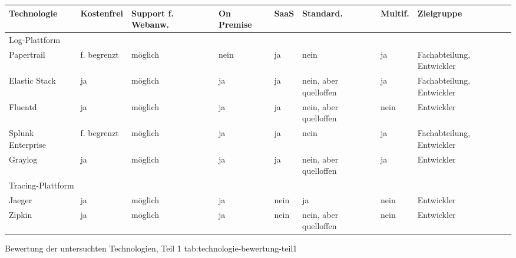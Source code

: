 %
{
\begin{tabular}{|p{2.25cm}|p{2.0cm}|p{2.0cm}|p{2.0cm}|p{1.5cm}|p{2.0cm}|p{1.5cm}|p{2.5cm}|}
\hline
Technologie & Kostenfrei & Support f. Webanw. & On Premise & SaaS & Standard. & Multif. & Zielgruppe \\
\hline
\hline
\multicolumn{7}{|l|}{Log-Plattform} \\
\hline
Papertrail & f. begrenzt & möglich & nein & ja & nein & ja & Fachabteilung, Entwickler \\
\hline
Elastic Stack & ja & möglich & ja & ja & nein, aber quelloffen & ja & Fachabteilung, Entwickler \\
\hline
Fluentd & ja & möglich & ja & ja & nein, aber quelloffen & nein & Entwickler \\
\hline
Splunk \mbox{Enterprise} & f. begrenzt & möglich & ja & ja & nein & ja & Fachabteilung, Entwickler \\
\hline
Graylog & ja & möglich & ja & ja & nein, aber quelloffen & ja & Entwickler \\
\hline
\hline
\multicolumn{7}{|l|}{Tracing-Plattform} \\
\hline
Jaeger & ja & möglich & ja & nein & ja & nein & Entwickler \\
\hline
Zipkin & ja & möglich & ja & nein & nein, aber quelloffen & nein & Entwickler \\
\hline
\end{tabular}
}
{Bewertung der untersuchten Technologien, Teil 1}
{tab:technologie-bewertung-teil1}

